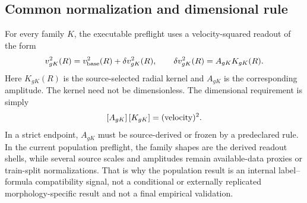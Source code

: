 \documentclass[11pt]{article}
\begin{document}
\begin{table}[H]
\centering
\caption{Logical status of the bridge-to-kernel construction.}
\scriptsize
{}
\label{tab:bridge-layer-status}
\end{table}

\subsection{Common normalization and dimensional rule}

For every family \(K\), the executable preflight uses a velocity-squared
readout of the form
\[
v_{gK}^2(R)=v_{\rm base}^2(R)+\delta v_{gK}^2(R),
\qquad
\delta v_{gK}^2(R)=A_{gK}K_{gK}(R).
\]
Here \(K_{gK}(R)\) is the source-selected radial kernel and \(A_{gK}\) is the
corresponding amplitude.  The kernel need not be dimensionless.  The
dimensional requirement is simply
\[
[A_{gK}]\,[K_{gK}]=({\rm velocity})^2 .
\]
In a strict endpoint, \(A_{gK}\) must be source-derived or frozen by a
predeclared rule.  In the current population preflight, the family shapes are
the derived readout shells, while several source scales and amplitudes remain
available-data proxies or train-split normalizations.  That is why the
population result is an internal label--formula compatibility signal, not a
conditional or externally replicated morphology-specific result and not a final
empirical validation.
\end{document}
